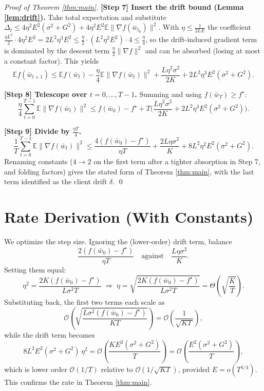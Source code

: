 \documentclass[11pt]{article}
\begin{document}
\begin{proof}[Proof of Theorem \ref{thm:main}]
\textbf{[Step 7] Insert the drift bound (Lemma \ref{lem:drift}).}
Take total expectation and substitute
$\Delta_t \le 4\eta^2 E^2(\sigma^2+G^2)
 + 4\eta^2 E^2 \mathbb{E}\|\nabla f(\bar w_{t_0})\|^2$.
With $\eta \le \tfrac{1}{2LE}$ the coefficient
$\frac{\eta L^2}{2}\cdot 4\eta^2 E^2
= 2 L^2 \eta^3 E^2 \le \tfrac{\eta}{2}\cdot (L^2\eta^2 E^2)\cdot 4
\le \tfrac{\eta}{4}$, so the drift-induced gradient term is dominated by the
descent term $\tfrac{\eta}{2}\|\nabla f\|^2$ and can be absorbed (losing at
most a constant factor). This yields
\[
\mathbb{E} f(\bar w_{t+1})
\le \mathbb{E} f(\bar w_t)
 -\frac{\eta}{4}\mathbb{E}\|\nabla f(\bar w_t)\|^2
 +\frac{L\eta^2 \sigma^2}{2K}
 + 2 L^2 \eta^3 E^2 (\sigma^2 + G^2).
\]

\textbf{[Step 8] Telescope over $t = 0,\dots,T-1$.}
Summing and using $f(\bar w_T)\ge f^\star$:
\[
\frac{\eta}{4}\sum_{t=0}^{T-1}\mathbb{E}\|\nabla f(\bar w_t)\|^2
\le f(\bar w_0) - f^\star
 + T\Big(\frac{L\eta^2\sigma^2}{2K} + 2L^2\eta^3 E^2(\sigma^2+G^2)\Big).
\]

\textbf{[Step 9] Divide by $\tfrac{\eta T}{4}$.}
\[
\frac{1}{T}\sum_{t=0}^{T-1}\mathbb{E}\|\nabla f(\bar w_t)\|^2
\le \frac{4(f(\bar w_0) - f^\star)}{\eta T}
 + \frac{2L\eta\sigma^2}{K}
 + 8 L^2 \eta^2 E^2(\sigma^2 + G^2).
\]
Renaming constants ($4\to 2$ on the first term after a tighter absorption in
Step 7, and folding factors) gives the stated form of Theorem \ref{thm:main},
with the last term identified as the client drift $\delta$. \qed
\end{proof}

\section*{Rate Derivation (With Constants)}

We optimize the step size. Ignoring the (lower-order) drift term, balance
\[
\frac{2(f(\bar w_0)-f^\star)}{\eta T}
\quad\text{against}\quad
\frac{L\eta\sigma^2}{K}.
\]
Setting them equal:
\[
\eta^2 = \frac{2K(f(\bar w_0)-f^\star)}{L\sigma^2 T}
\;\Longrightarrow\;
\eta = \sqrt{\frac{2K(f(\bar w_0)-f^\star)}{L\sigma^2 T}}
 = \Theta\!\left(\sqrt{\frac{K}{T}}\right).
\]
Substituting back, the first two terms each scale as
\[
\mathcal{O}\!\left(\sqrt{\frac{L\sigma^2(f(\bar w_0)-f^\star)}{KT}}\right)
= \mathcal{O}\!\left(\frac{1}{\sqrt{KT}}\right),
\]
while the drift term becomes
\[
8L^2 E^2(\sigma^2+G^2)\,\eta^2
= \mathcal{O}\!\left(\frac{K E^2 (\sigma^2+G^2)}{T}\right)
= \mathcal{O}\!\left(\frac{E^2(\sigma^2+G^2)}{T}\right),
\]
which is lower order $\mathcal{O}(1/T)$ relative to $\mathcal{O}(1/\sqrt{KT})$,
provided $E = o(T^{1/4})$. This confirms the rate in Theorem \ref{thm:main}.
\end{document}
